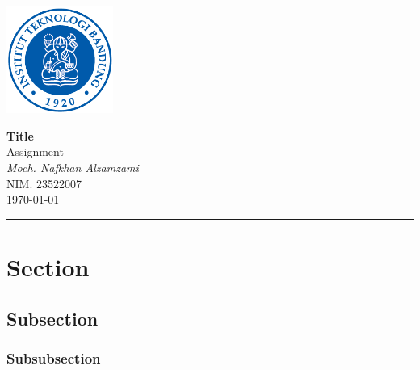\documentclass[12pt,a4paper]{article}
\begin{document}
\textcolor{UM_Brown}{
\begin{minipage}{0.1\textwidth}
    \begin{flushleft}
        \includegraphics[height=3.5cm]{logo_itb_256.png}
    \end{flushleft}
\end{minipage}
\begin{minipage}{0.8\textwidth}
    \begin{center}
        \textbf{\Large Title}\\
        \vspace{5pt}
        Assignment \\
        \vspace{20pt}
        \textit{Moch. Nafkhan Alzamzami} \\
        \vspace{5pt}
        NIM. 23522007 \\
        \vspace{5pt}
        \today
    \end{center}
\end{minipage}
\vspace{10pt}
\hrule
}

\section{Section}
\lipsum[1]

\subsection{Subsection}
\lipsum[1]

\subsubsection{Subsubsection}
\lipsum[1]

\begin{thebibliography}{}
\end{thebibliography}
\end{document}
